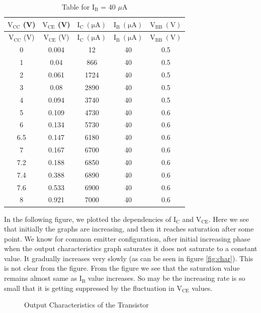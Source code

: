 \documentclass[12pt]{article}
\begin{document}
\begin{longtable}[H]{|c|c|c|c|c|}
    \caption{Table for \( \mathrm{I_B}\) = 40 \( \mu \)A }
    \endfirsthead
    \hline
    $\mathrm{V_{CC}}$ (V) & $\mathrm{V_{CE}}$ (V) & $\mathrm{I_C \ (\mu A)}$ & $\mathrm{I_B \ (\mu A)}$ & $\mathrm{V_{BB} \ (V)}$ \\ \hline \hline
    \endhead 
    \hline
    $\mathrm{V_{CC}}$ (V) & $\mathrm{V_{CE}}$ (V) & $\mathrm{I_C \ (\mu A)}$ & $\mathrm{I_B \ (\mu A)}$ & $\mathrm{V_{BB} \ (V)}$ \\ \hline \hline
        0     & 0.004         & 12           & 40           & 0.5   \\  \hline
        1     & 0.04          & 866          & 40           & 0.5   \\  \hline
        2     & 0.061         & 1724         & 40           & 0.5   \\  \hline
        3     & 0.08          & 2890         & 40           & 0.5   \\  \hline
        4     & 0.094         & 3740         & 40           & 0.5   \\  \hline
        5     & 0.109         & 4730         & 40           & 0.6   \\  \hline
        6     & 0.134         & 5730         & 40           & 0.6   \\  \hline
        6.5   & 0.147         & 6180         & 40           & 0.6   \\  \hline
        7     & 0.167         & 6700         & 40           & 0.6   \\  \hline
        7.2   & 0.188         & 6850         & 40           & 0.6   \\  \hline
        7.4   & 0.388         & 6890         & 40           & 0.6   \\  \hline
        7.6   & 0.533         & 6900         & 40           & 0.6   \\  \hline
        8     & 0.921         & 7000         & 40           & 0.6   \\ \hline
\end{longtable}

In the following figure, we plotted the dependencies of $\mathrm{I_C}$ and $\mathrm{V_{CE}}$. Here we see that initially the graphs are increasing, and then it reaches saturation after some point. We know for common emitter configuration, after initial increasing phase when the output characteristics graph saturates it does not saturate to a constant value. It gradually increases very slowly (as can be seen in figure \ref{fig:char}). This is not clear from the figure. From the figure we see that the saturation value remains almost same as \( \mathrm{I_B }\) value increases. So may be the increasing rate is so small that it is getting suppressed by the fluctuation in \( \mathrm{V_{CE}}\) values. 
\begin{figure}[H]
    \centering
    
    \caption{Output Characteristics of the Transistor}
\end{figure}
\end{document}
